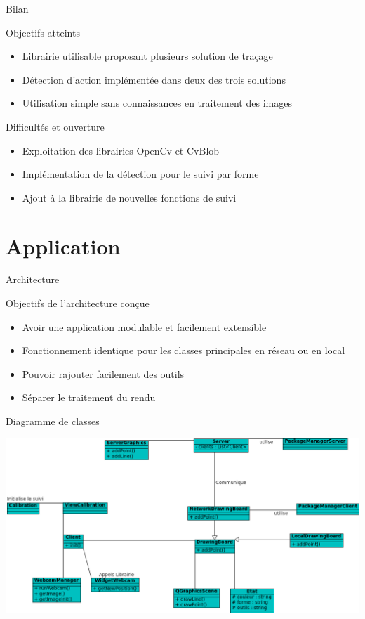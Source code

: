 \documentclass{beamer}
\begin{document}
		\begin{frame}{Bilan}
			\begin{exampleblock}{Objectifs atteints}
				\begin{itemize}
				\item Librairie utilisable proposant plusieurs solution de traçage
				\item Détection d'action implémentée dans deux des trois solutions
				\item Utilisation simple sans connaissances en traitement des images
				\end{itemize}
			\end{exampleblock}
			\pause
			\begin{alertblock}{Difficultés et ouverture}
				\begin{itemize}
				\item Exploitation des librairies OpenCv et CvBlob 
				\item Implémentation de la détection pour le suivi par forme
				\item Ajout à la librairie de nouvelles fonctions de suivi
				\end{itemize}
			\end{alertblock}
		\end{frame}
	
	\section{Application}
		\begin{frame}{Architecture}
			\begin{block}{Objectifs de l'architecture conçue}
				\begin{itemize}
				\item{Avoir une application modulable et facilement extensible}
				\item{Fonctionnement identique pour les classes principales en réseau ou en local}
				\item{Pouvoir rajouter facilement des outils}
				\item{Séparer le traitement du rendu}
				\end{itemize}
			\end{block}
		\end{frame}
		
		\begin{frame}{Diagramme de classes}
			\begin{center}		
			\includegraphics[scale=0.45]{../uml/classes.png}
			\end{center}
		\end{frame}
\end{document}
